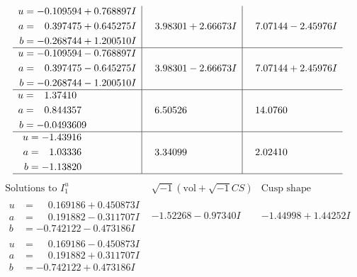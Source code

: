 \documentclass[1p]{elsarticle_modified}
\theoremstyle{definition}
\newcommand{\I}{\sqrt{-1}}
\begin{document}
$$\begin{array}{c|c|c}
\begin{aligned}
u &= -0.109594 + 0.768897 I \\
a &= \phantom{-}0.397475 + 0.645275 I \\
b &= -0.268744 + 1.200510 I\end{aligned}
 & \phantom{-}3.98301 + 2.66673 I & \phantom{-}7.07144 - 2.45976 I \\ \hline\begin{aligned}
u &= -0.109594 - 0.768897 I \\
a &= \phantom{-}0.397475 - 0.645275 I \\
b &= -0.268744 - 1.200510 I\end{aligned}
 & \phantom{-}3.98301 - 2.66673 I & \phantom{-}7.07144 + 2.45976 I \\ \hline\begin{aligned}
u &= \phantom{-}1.37410\phantom{ +0.000000I} \\
a &= \phantom{-}0.844357\phantom{ +0.000000I} \\
b &= -0.0493609\phantom{ +0.000000I}\end{aligned}
 & \phantom{-}6.50526\phantom{ +0.000000I} & \phantom{-}14.0760\phantom{ +0.000000I} \\ \hline\begin{aligned}
u &= -1.43916\phantom{ +0.000000I} \\
a &= \phantom{-}1.03336\phantom{ +0.000000I} \\
b &= -1.13820\phantom{ +0.000000I}\end{aligned}
 & \phantom{-}3.34099\phantom{ +0.000000I} & \phantom{-}2.02410\phantom{ +0.000000I}\\
 \hline 
 \end{array}$$\newpage$$\begin{array}{c|c|c}  
\text{Solutions to }I^u_{1}& \I (\text{vol} + \sqrt{-1}CS) & \text{Cusp shape}\\
 \hline 
\begin{aligned}
u &= \phantom{-}0.169186 + 0.450873 I \\
a &= \phantom{-}0.191882 - 0.311707 I \\
b &= -0.742122 - 0.473186 I\end{aligned}
 & -1.52268 - 0.97340 I & -1.44998 + 1.44252 I \\ \hline\begin{aligned}
u &= \phantom{-}0.169186 - 0.450873 I \\
a &= \phantom{-}0.191882 + 0.311707 I \\
b &= -0.742122 + 0.473186 I\end{aligned}

\end{array}$$
\end{document}
